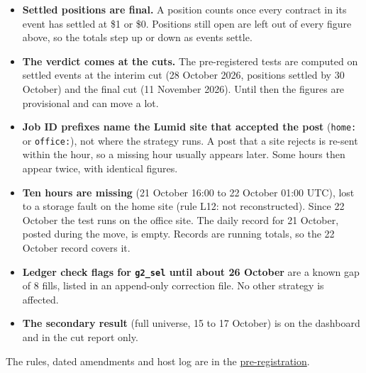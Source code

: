 \documentclass[11pt,a4paper]{article}
\newcommand{\job}[1]{\texttt{#1}}
\begin{document}
\begin{itemize}[leftmargin=*,itemsep=1pt]
  \item \textbf{Settled positions are final.} A position counts once every contract in its event has settled at \$1
  or \$0. Positions still open are left out of every figure above, so the totals step up or down as events settle.
  \item \textbf{The verdict comes at the cuts.} The pre-registered tests are computed on settled events at the
  interim cut (28 October 2026, positions settled by 30 October) and the final cut (11 November 2026). Until then the
  figures are provisional and can move a lot.
  \item \textbf{Job ID prefixes name the Lumid site that accepted the post} (\job{home:} or \job{office:}), not where
  the strategy runs. A post that a site rejects is re-sent within the hour, so a missing hour usually appears later.
  Some hours then appear twice, with identical figures.
  \item \textbf{Ten hours are missing} (21 October 16:00 to 22 October 01:00 UTC), lost to a storage fault on the home
  site (rule L12: not reconstructed). Since 22 October the test runs on the office site. The daily record for
  21 October, posted during the move, is empty. Records are running totals, so the 22 October record covers it.
  \item \textbf{Ledger check flags for \job{g2\_sel} until about 26 October} are a known gap of 8 fills, listed in an
  append-only correction file. No other strategy is affected.
  \item \textbf{The secondary result} (full universe, 15 to 17 October) is on the dashboard and in the cut report only.
\end{itemize}

The rules, dated amendments and host log are in the
\href{https://github.com/curiousfun88/event-pred/blob/main/docs/planning/lumid-forward-test-preregistration.md}{pre-registration}.
\end{document}
